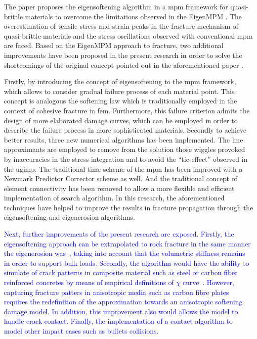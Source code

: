 \documentclass[preprint,12pt,a4paper]{elsarticle}
\begin{document}
The paper proposes the eigensoftening algorithm in a \acrshort{mpm} framework for quasi-brittle materials to overcome the limitations observed in the EigenMPM \cite{Zhang_EE_2020}. The overestimation of tensile 
stress and strain peaks in the fracture mechanism of quasi-brittle
materials and the stress oscillations observed with conventional
\acrshort{mpm} are faced. Based on the
EigenMPM approach to fracture, two additional improvements have been proposed in the present research in order to solve the shortcomings of the original concept pointed out in the aforementioned paper \cite{Zhang_EE_2020}.

Firstly, by introducing the concept of eigensoftening to the \acrshort{mpm} framework,
which allows to consider gradual failure process of each material point. This concept is analogous the softening law which is traditionally employed in the context
of cohesive fracture in \acrshort{fem}. Furthermore, this failure
criterion admits the design of more elaborated damage curves, which
can be employed in order to describe the failure process in more
sophisticated materials. Secondly to achieve better results, three new
numerical algorithms has been implemented. The \acrshort{lme}
approximants are employed to remove from
the solution those wiggles provoked by inaccuracies in the stress
integration and to avoid the ``tie-effect'' observed in the
\acrshort{ugimp}. The traditional time scheme of the \acrshort{mpm}
has been improved with a Newmark Predictor Corrector scheme as
well. And the traditional concept of element connectivity has been
removed to allow a more flexible and efficient implementation of
search algorithm. In this research, the aforementioned techniques have helped
to improve the results in fracture propagation through the
eigensoftening and eigenerosion algorithms.

\textcolor{blue}{Next, further improvements of the present research are exposed. Firstly, the eigensoftening approach can be extrapolated to rock fracture in the same manner the eigenerosion was~\cite{Wang2017}, taking into account that the volumetric stiffness remains in order to support bulk loads. Secondly, the algorithm would have the ability to simulate of crack patterns in
composite material such as steel or carbon fiber reinforced concretes by means of empirical definitions of $\chi$ curve~\cite{Navas_2018_ES}. However, capturing fracture patters in anisotropic media such as carbon fibre plates requires the redefinition of the approximation towards an anisotropic softening damage model. In addition, this improvement also would allows the model to handle crack contact. Finally, the implementation of a contact algorithm to model other impact cases such as bullets collisions.}
\end{document}
